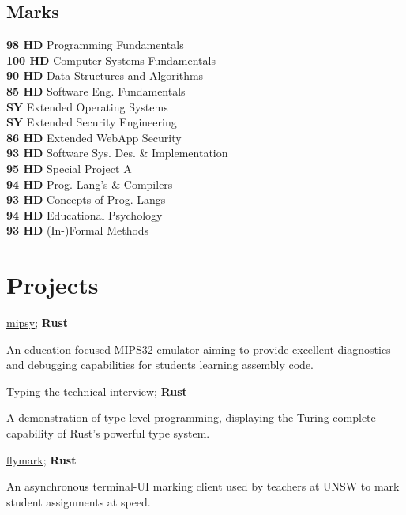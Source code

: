 \documentclass[a4paper]{deedy-resume}
\begin{document}
\begin{minipage}[t]{0.35\textwidth}
\subsection{Marks}
\textbf{98 HD} Programming Fundamentals \\
\textbf{100 HD} Computer Systems Fundamentals \\
\textbf{90 HD} Data Structures and Algorithms \\
\textbf{85 HD} Software Eng. Fundamentals \\
\textbf{SY} Extended Operating Systems \\
\textbf{SY} Extended Security Engineering \\
\textbf{86 HD} Extended WebApp Security \\
\textbf{93 HD} Software Sys. Des. \& Implementation \\
\textbf{95 HD} Special Project A \\
\textbf{94 HD} Prog. Lang's \& Compilers \\
\textbf{93 HD} Concepts of Prog. Langs \\
\textbf{94 HD} Educational Psychology \\
\textbf{93 HD} (In-)Formal Methods


\section{Projects}

\href{https://github.com/insou22/mipsy}
	{\underline{mipsy}}; \textbf{ Rust}

An education-focused MIPS32 emulator
aiming to provide excellent diagnostics
and debugging capabilities for students
learning assembly code.

\vspace{6pt}

\href{https://github.com/insou22/typing-the-technical-interview-rust}
	{\underline{Typing the technical interview}}; \textbf{Rust}

A demonstration of type-level programming,
displaying the Turing-complete capability
of Rust's powerful type system.

\vspace{6pt}

\href{https://github.com/insou22/flymark}
	{\underline{flymark}}; \textbf{ Rust}

An asynchronous terminal-UI marking client
used by teachers at UNSW to mark student
assignments at speed.


\end{minipage}
\end{document}
